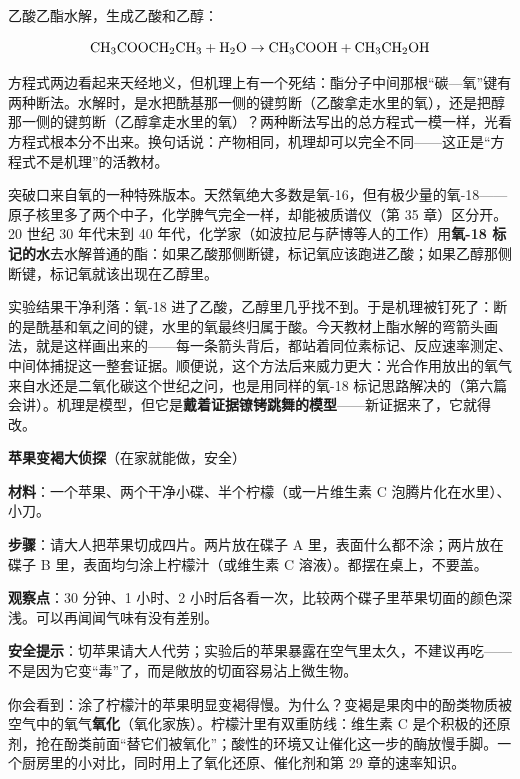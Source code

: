 \begin{zhengju}
乙酸乙酯水解，生成乙酸和乙醇：

\[\mathrm{CH_3COOCH_2CH_3} + \mathrm{H_2O} \rightarrow \mathrm{CH_3COOH} + \mathrm{CH_3CH_2OH}\]

方程式两边看起来天经地义，但机理上有一个死结：酯分子中间那根“碳—氧”键有两种断法。水解时，是水把酰基那一侧的键剪断（乙酸拿走水里的氧），还是把醇那一侧的键剪断（乙醇拿走水里的氧）？两种断法写出的总方程式一模一样，光看方程式根本分不出来。换句话说：产物相同，机理却可以完全不同——这正是“方程式不是机理”的活教材。

突破口来自氧的一种特殊版本。天然氧绝大多数是氧-16，但有极少量的氧-18——原子核里多了两个中子，化学脾气完全一样，却能被质谱仪（第 35 章）区分开。20 世纪 30 年代末到 40 年代，化学家（如波拉尼与萨博等人的工作）用\textbf{氧-18 标记的水}去水解普通的酯：如果乙酸那侧断键，标记氧应该跑进乙酸；如果乙醇那侧断键，标记氧就该出现在乙醇里。

实验结果干净利落：氧-18 进了乙酸，乙醇里几乎找不到。于是机理被钉死了：断的是酰基和氧之间的键，水里的氧最终归属于酸。今天教材上酯水解的弯箭头画法，就是这样画出来的——每一条箭头背后，都站着同位素标记、反应速率测定、中间体捕捉这一整套证据。顺便说，这个方法后来威力更大：光合作用放出的氧气来自水还是二氧化碳这个世纪之问，也是用同样的氧-18 标记思路解决的（第六篇会讲）。机理是模型，但它是\textbf{戴着证据镣铐跳舞的模型}——新证据来了，它就得改。
\end{zhengju}

\begin{shiyan}
\textbf{苹果变褐大侦探}（在家就能做，安全）

\textbf{材料}：一个苹果、两个干净小碟、半个柠檬（或一片维生素 C 泡腾片化在水里）、小刀。

\textbf{步骤}：请大人把苹果切成四片。两片放在碟子 A 里，表面什么都不涂；两片放在碟子 B 里，表面均匀涂上柠檬汁（或维生素 C 溶液）。都摆在桌上，不要盖。

\textbf{观察点}：30 分钟、1 小时、2 小时后各看一次，比较两个碟子里苹果切面的颜色深浅。可以再闻闻气味有没有差别。

\textbf{安全提示}：切苹果请大人代劳；实验后的苹果暴露在空气里太久，不建议再吃——不是因为它变“毒”了，而是敞放的切面容易沾上微生物。

你会看到：涂了柠檬汁的苹果明显变褐得慢。为什么？变褐是果肉中的酚类物质被空气中的氧气\textbf{氧化}（氧化家族）。柠檬汁里有双重防线：维生素 C 是个积极的还原剂，抢在酚类前面“替它们被氧化”；酸性的环境又让催化这一步的酶放慢手脚。一个厨房里的小对比，同时用上了氧化还原、催化剂和第 29 章的速率知识。
\end{shiyan}

